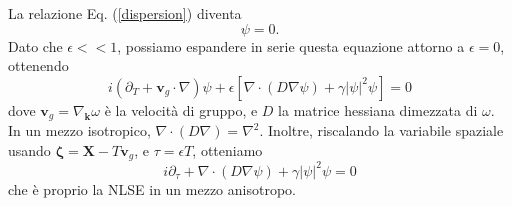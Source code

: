 \documentclass[10pt]{article}
\begin{document}
La relazione Eq. (\ref{dispersion}) diventa
\begin{equation}
	[i\omega + \epsilon \partial_T - \Omega(\mathbf{k}-i\epsilon\nabla, \epsilon^2|\psi|^2)]\psi = 0.
\end{equation}
Dato che $\epsilon<<1$, possiamo espandere in serie questa equazione attorno a $\epsilon=0$, ottenendo
\begin{equation}
	i(\partial_T + \mathbf{v}_g \cdot \nabla)\psi + \epsilon[\nabla \cdot (D\nabla\psi) + \gamma|\psi|^2\psi]=0
\end{equation}
dove $\mathbf{v}_g=\nabla_\mathbf{k}\omega$ è la velocità di gruppo, e $D$ la matrice hessiana dimezzata di $\omega$. 
In un mezzo isotropico, $\nabla \cdot (D\nabla) = \nabla^2$. Inoltre, riscalando la variabile spaziale usando  $\mathbf{\zeta} = \mathbf{X} - T\mathbf{v}_g$, e $\tau = \epsilon T$, otteniamo
\begin{equation}
	i\partial_\tau +\nabla \cdot (D\nabla\psi) + \gamma |\psi|^2 \psi = 0
\end{equation}
che è proprio la NLSE in un mezzo anisotropo.
\end{document}
